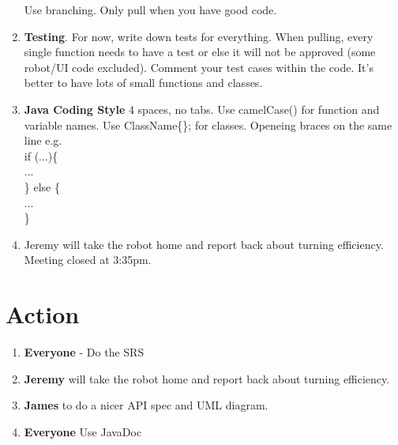 \documentclass{article}
\begin{document}
\begin{enumerate}
Use branching. Only pull when you have good code.

\item \textbf{Testing}. For now, write down tests for everything. When pulling, every single function needs to have a test or else it will not be approved (some robot/UI code excluded). Comment your test cases within the code. It's better to have lots of small functions and classes.

\item \textbf{Java Coding Style}
4 spaces, no tabs. Use camelCase() for function and variable names. Use ClassName\{\}; for classes. Openeing braces on the same line e.g.\\ if (...)\{ \\
\hspace{.5cm}...\\ \} else \{ \\ \hspace{.5cm}...\\ \}\\

\item Jeremy will take the robot home and report back about turning efficiency.\\
Meeting closed at 3:35pm.
\end{enumerate}

\section{Action}
\begin{enumerate}
\item \textbf{Everyone} - Do the SRS
\item \textbf{Jeremy} will take the robot home and report back about turning efficiency.
\item \textbf{James} to do a nicer API spec and UML diagram.
\item \textbf{Everyone} Use JavaDoc

\end{enumerate}
\end{document}
